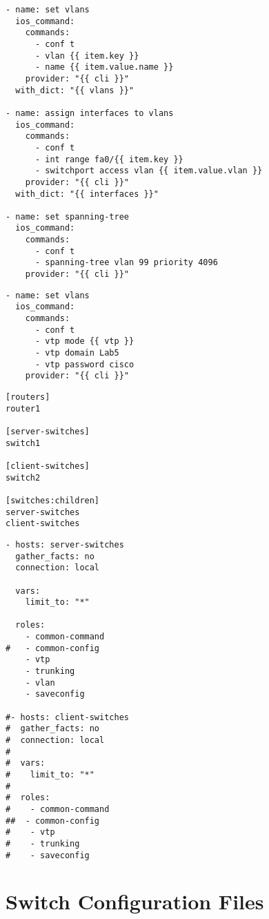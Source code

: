 \begin{Verbatim}[frame=topline, framesep=4mm, label=\fbox{roles/vlan/tasks/main.yaml}]
- name: set vlans
  ios_command:
    commands:
      - conf t
      - vlan {{ item.key }}
      - name {{ item.value.name }}
    provider: "{{ cli }}"
  with_dict: "{{ vlans }}"

- name: assign interfaces to vlans
  ios_command:
    commands:
      - conf t
      - int range fa0/{{ item.key }}
      - switchport access vlan {{ item.value.vlan }}
    provider: "{{ cli }}"
  with_dict: "{{ interfaces }}"

- name: set spanning-tree
  ios_command:
    commands:
      - conf t
      - spanning-tree vlan 99 priority 4096
    provider: "{{ cli }}"
\end{Verbatim}
\begin{Verbatim}[frame=topline, framesep=4mm, label=\fbox{roles/vtp/tasks/main.yaml}]
- name: set vlans
  ios_command:
    commands:
      - conf t
      - vtp mode {{ vtp }}
      - vtp domain Lab5
      - vtp password cisco
    provider: "{{ cli }}"

\end{Verbatim}
\begin{Verbatim}[frame=topline, framesep=4mm, label=\fbox{./inventory}]
[routers]
router1

[server-switches]
switch1

[client-switches]
switch2

[switches:children]
server-switches
client-switches
\end{Verbatim}
\begin{Verbatim}[frame=topline, framesep=4mm, label=\fbox{group\_vars/switches.yaml}]
- hosts: server-switches
  gather_facts: no
  connection: local

  vars:
    limit_to: "*"

  roles:
    - common-command
#   - common-config
    - vtp
    - trunking
    - vlan
    - saveconfig

#- hosts: client-switches
#  gather_facts: no
#  connection: local
#
#  vars:
#    limit_to: "*"
#
#  roles:
#    - common-command
##  - common-config
#    - vtp
#    - trunking
#    - saveconfig

\end{Verbatim}

\section{Switch Configuration Files }
\label{ch:switchconfigsannexes}

